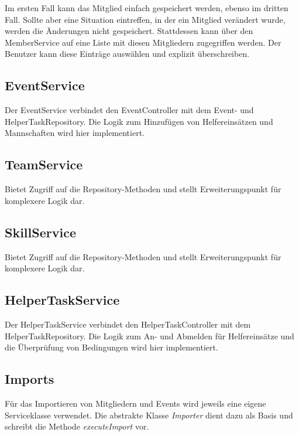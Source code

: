 	\noindent	
	Im ersten Fall kann das Mitglied einfach gespeichert werden, ebenso im dritten Fall. Sollte aber eine Situation eintreffen, in der ein Mitglied verändert wurde, werden die Änderungen nicht gespeichert. Stattdessen kann über den MemberService auf eine Liste mit diesen Mitgliedern zugegriffen werden. Der Benutzer kann diese Einträge auswählen und explizit überschreiben.
	
	
	\subsection{EventService}
	Der EventService verbindet den EventController mit dem Event- und HelperTaskRepository. Die Logik zum Hinzufügen von Helfereinsätzen und Mannschaften wird hier implementiert.
	
	\subsection{TeamService}
	Bietet Zugriff auf die Repository-Methoden und stellt Erweiterungspunkt für komplexere Logik dar.
	
	\subsection{SkillService}
	Bietet Zugriff auf die Repository-Methoden und stellt Erweiterungspunkt für komplexere Logik dar.
	
	\subsection{HelperTaskService}
	Der HelperTaskService verbindet den HelperTaskController mit dem HelperTaskRepository. Die Logik zum An- und Abmelden für Helfereinsätze und die Überprüfung von Bedingungen wird hier implementiert.
		
	
	\subsection{Imports}
	Für das Importieren von Mitgliedern und Events wird jeweils eine eigene Serviceklasse verwendet. Die abstrakte Klasse \textit{Importer} dient dazu als Basis und schreibt die Methode \textit{executeImport} vor.
	
